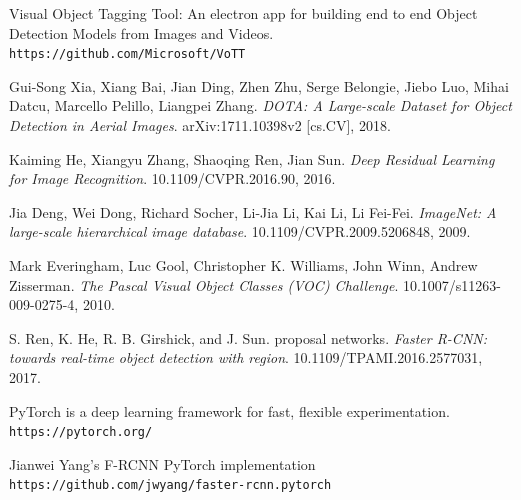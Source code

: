 \documentclass[]{article}
\begin{document}
\begin{thebibliography}{9}
	Visual Object Tagging Tool: An electron app for building end to end Object Detection Models from Images and Videos.
	\\\texttt{https://github.com/Microsoft/VoTT}
	
	Gui-Song Xia, Xiang Bai, Jian Ding, Zhen Zhu, Serge Belongie, Jiebo Luo, Mihai Datcu, Marcello Pelillo, Liangpei Zhang.
	\textit{DOTA: A Large-scale Dataset for Object Detection in Aerial Images}. 
	arXiv:1711.10398v2 [cs.CV], 2018.
	
	Kaiming He, Xiangyu Zhang, Shaoqing Ren, Jian Sun.
	\textit{Deep Residual Learning for Image Recognition}. 
	10.1109/CVPR.2016.90, 2016.
	
	 Jia Deng, Wei Dong, Richard Socher, Li-Jia Li, Kai Li, Li Fei-Fei.
	\textit{ImageNet: A large-scale hierarchical image database}. 
	10.1109/CVPR.2009.5206848, 2009.
	
	Mark Everingham, Luc Gool, Christopher K. Williams, John Winn, Andrew Zisserman.
	\textit{The Pascal Visual Object Classes (VOC) Challenge}. 
	10.1007/s11263-009-0275-4, 2010.
	
	S. Ren, K. He, R. B. Girshick, and J. Sun.
	proposal networks.
	\textit{Faster R-CNN: towards real-time object detection with region}. 
	10.1109/TPAMI.2016.2577031, 2017.
	
	PyTorch is a deep learning framework for fast, flexible experimentation.
	\\\texttt{https://pytorch.org/}
	
	Jianwei Yang's F-RCNN PyTorch implementation
	\\\texttt{https://github.com/jwyang/faster-rcnn.pytorch}
	
\end{thebibliography}
\end{document}
